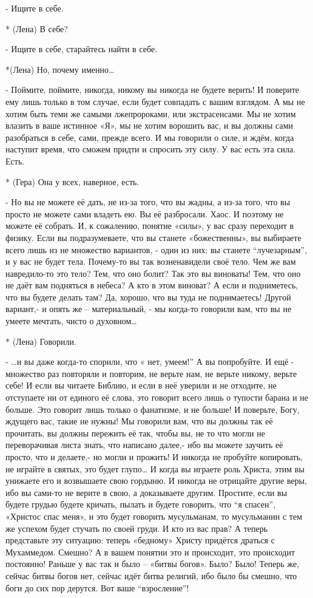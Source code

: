 - Ищите в себе.

* (Лена) В себе?

- Ищите в себе, старайтесь найти в себе.

*(Лена) Но, почему именно…

-  Поймите, поймите, никогда, никому вы никогда не будете верить! И поверите ему лишь только в том случае, если будет совпадать с вашим взглядом. А мы не хотим быть теми же самыми лжепророками, или экстрасенсами. Мы не хотим влазить в ваше истинное «Я», мы не хотим ворошить вас, и вы должны сами разобраться в себе, сами, прежде всего. И мы говорили о силе, и ждём, когда наступит время, что сможем придти и спросить эту силу. У вас есть эта сила. Есть.

* (Гера) Она у всех, наверное, есть.

- Но вы не можете её дать, не из-за того, что вы жадны, а из-за того, что вы просто не можете сами владеть ею. Вы её разбросали.  Хаос.  И поэтому не можете её собрать. И, к сожалению, понятие «силы», у вас сразу переходит в физику. Если вы подразумеваете, что вы станете «божественны», вы выбираете всего лишь из не множество вариантов, - один из них: вы станете “лучезарным”, и у вас не будет тела. Почему-то вы так возненавидели своё тело. Чем же вам навредило-то это тело? Тем, что оно болит? Так это вы виноваты! Тем, что оно не даёт вам подняться в небеса? А кто в этом виноват? А если и подниметесь, что вы будете делать там? Да, хорошо, что вы туда не поднимаетесь! Другой вариант,- и опять же – материальный, - мы когда-то говорили вам, что вы не умеете мечтать, чисто о духовном…

* (Лена) Говорили.

- …и  вы даже когда-то спорили, что « нет, умеем!” А вы попробуйте. И ещё - множество раз повторяли и повторим, не верьте нам, не верьте никому, верьте себе! И если вы читаете Библию, и если в неё уверили и не отходите, не отступаете ни от единого её слова, это говорит всего лишь о тупости барана и не больше. Это говорит лишь только о фанатизме, и не больше! И поверьте, Богу, ждущего вас, такие не нужны! Мы говорили вам, что вы должны так её прочитать, вы должны пережить её так, чтобы вы, не то что могли не переворачивая листа знать, что написано далее,- ибо вы можете заучить её просто, что и делаете,- но могли и прожить! И никогда не пробуйте копировать, не играйте в святых, это будет глупо… И когда вы играете роль Христа, этим вы унижаете его и возвышаете свою гордыню. И никогда не отрицайте другие веры, ибо вы сами-то не верите в свою, а доказываете другим. Простите, если вы будете грудью будете кричать, пылать и будете говорить, что “я спасен”, «Христос спас меня», и это будет говорить мусульманам, то мусульманин с тем же успехом будет стучать по своей груди. И кто из вас прав? А теперь представьте эту ситуацию: теперь «бедному» Христу придётся драться с Мухаммедом. Смешно? А в вашем понятии это и происходит, это происходит постоянно! Раньше у вас так и было – «битвы богов». Было? Было! Теперь же, сейчас битвы богов нет, сейчас идёт битва религий, ибо было бы смешно, что боги до сих пор дерутся. Вот ваше “взросление”!

